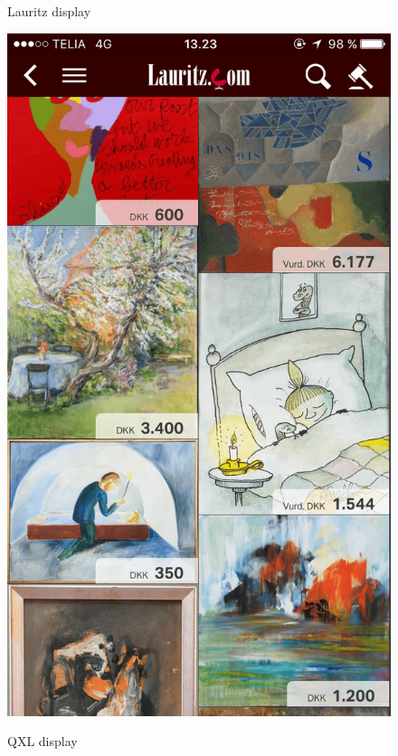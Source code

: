 \begin{figure}[H]
\centering
  \begin{minipage}[b]{0.285\linewidth}
    \caption{Lauritz display}
    \includegraphics[width=\linewidth]{Appendix/ScreenshotsCompetitorsPlatforms/Lauritz-min.png}
    \label{LauritzDisplay}
  \end{minipage}
  \hspace{0.6cm}
  \begin{minipage}[b]{0.285\linewidth}
    \caption{QXL display}

\end{minipage}
\end{figure}
